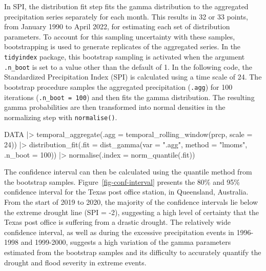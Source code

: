 \documentclass[
]{interact}
\newenvironment{Shaded}{\begin{snugshade}}{\end{snugshade}}
\newcommand{\AttributeTok}[1]{\textcolor[rgb]{0.40,0.45,0.13}{#1}}
\newcommand{\DecValTok}[1]{\textcolor[rgb]{0.68,0.00,0.00}{#1}}
\newcommand{\FunctionTok}[1]{\textcolor[rgb]{0.28,0.35,0.67}{#1}}
\newcommand{\NormalTok}[1]{\textcolor[rgb]{0.00,0.23,0.31}{#1}}
\newcommand{\SpecialCharTok}[1]{\textcolor[rgb]{0.37,0.37,0.37}{#1}}
\newcommand{\StringTok}[1]{\textcolor[rgb]{0.13,0.47,0.30}{#1}}
\begin{document}
In SPI, the distribution fit step fits the gamma distribution to the
aggregated precipitation series separately for each month. This results
in 32 or 33 points, from January 1990 to April 2022, for estimating each
set of distribution parameters. To account for this sampling uncertainty
with these samples, bootstrapping is used to generate replicates of the
aggregated series. In the \texttt{tidyindex} package, this bootstrap
sampling is activated when the argument \texttt{.n\_boot} is set to a
value other than the default of 1. In the following code, the
Standardized Precipitation Index (SPI) is calculated using a time scale
of 24. The bootstrap procedure samples the aggregated precipitation
(\texttt{.agg}) for 100 iterations (\texttt{.n\_boot\ =\ 100}) and then
fits the gamma distribution. The resulting gamma probabilities are then
transformed into normal densities in the normalizing step with
\texttt{normalise()}.

\begin{Shaded}
\begin{Highlighting}[]
\NormalTok{DATA }\SpecialCharTok{|\textgreater{}} 
  \FunctionTok{temporal\_aggregate}\NormalTok{(}\AttributeTok{.agg =} \FunctionTok{temporal\_rolling\_window}\NormalTok{(prcp, }\AttributeTok{scale =} \DecValTok{24}\NormalTok{)) }\SpecialCharTok{|\textgreater{}} 
  \FunctionTok{distribution\_fit}\NormalTok{(}\AttributeTok{.fit =} \FunctionTok{dist\_gamma}\NormalTok{(}\AttributeTok{var =} \StringTok{".agg"}\NormalTok{, }\AttributeTok{method =} \StringTok{"lmoms"}\NormalTok{,}
                                     \AttributeTok{.n\_boot =} \DecValTok{100}\NormalTok{)) }\SpecialCharTok{|\textgreater{}}
  \FunctionTok{normalise}\NormalTok{(}\AttributeTok{.index =} \FunctionTok{norm\_quantile}\NormalTok{(.fit))}
\end{Highlighting}
\end{Shaded}

The confidence interval can then be calculated using the quantile method
from the bootstrap samples. Figure~\ref{fig-conf-interval} presents the
80\% and 95\% confidence interval for the Texas post office station, in
Queensland, Australia. From the start of 2019 to 2020, the majority of
the confidence intervals lie below the extreme drought line (SPI = -2),
suggesting a high level of certainty that the Texas post office is
suffering from a drastic drought. The relatively wide confidence
interval, as well as during the excessive precipitation events in
1996-1998 and 1999-2000, suggests a high variation of the gamma
parameters estimated from the bootstrap samples and its difficulty to
accurately quantify the drought and flood severity in extreme events.
\end{document}
